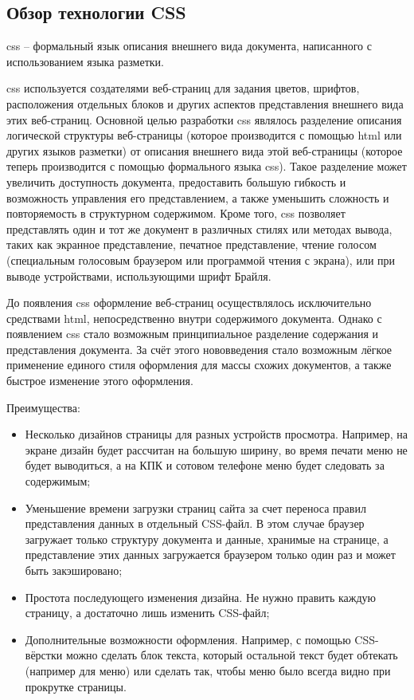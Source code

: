 \subsection{Обзор технологии CSS}

\gls{css} -- формальный язык описания внешнего вида документа, написанного с использованием языка разметки.

\gls{css} используется создателями веб-страниц для задания цветов, шрифтов, расположения отдельных блоков и других аспектов представления внешнего вида этих веб-страниц. Основной целью разработки \gls{css} являлось разделение описания логической структуры веб-страницы (которое производится с помощью \gls{html} или других языков разметки) от описания внешнего вида этой веб-страницы (которое теперь производится с помощью формального языка \gls{css}). Такое разделение может увеличить доступность документа, предоставить большую гибкость и возможность управления его представлением, а также уменьшить сложность и повторяемость в структурном содержимом. Кроме того, \gls{css} позволяет представлять один и тот же документ в различных стилях или методах вывода, таких как экранное представление, печатное представление, чтение голосом (специальным голосовым браузером или программой чтения с экрана), или при выводе устройствами, использующими шрифт Брайля.

До появления \gls{css} оформление веб-страниц осуществлялось исключительно средствами \gls{html}, непосредственно внутри содержимого документа. Однако с появлением \gls{css} стало возможным принципиальное разделение содержания и представления документа. За счёт этого нововведения стало возможным лёгкое применение единого стиля оформления для массы схожих документов, а также быстрое изменение этого оформления.

Преимущества:
\begin{itemize}
	\item Несколько дизайнов страницы для разных устройств просмотра. Например, на экране дизайн будет рассчитан на большую ширину, во время печати меню не будет выводиться, а на КПК и сотовом телефоне меню будет следовать за содержимым;
	\item Уменьшение времени загрузки страниц сайта за счет переноса правил представления данных в отдельный CSS-файл. В этом случае браузер загружает только структуру документа и данные, хранимые на странице, а представление этих данных загружается браузером только один раз и может быть закэшировано;
	\item Простота последующего изменения дизайна. Не нужно править каждую страницу, а достаточно лишь изменить CSS-файл;
	\item Дополнительные возможности оформления. Например, с помощью CSS-вёрстки можно сделать блок текста, который остальной текст будет обтекать (например для меню) или сделать так, чтобы меню было всегда видно при прокрутке страницы.
\end{itemize}

